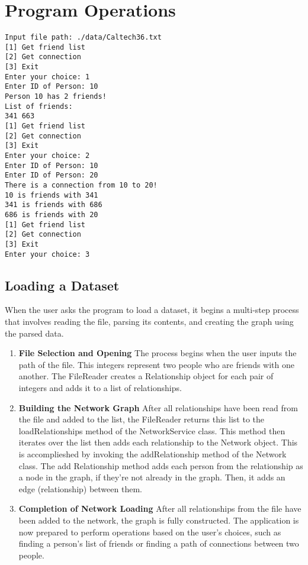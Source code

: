 \section*{\textbf{Program Operations}}

\lstset{basicstyle=\ttfamily}
\begin{lstlisting}[label=verb1,caption={A Sample Run of the Program},frame=tb]
Input file path: ./data/Caltech36.txt
[1] Get friend list
[2] Get connection
[3] Exit
Enter your choice: 1
Enter ID of Person: 10
Person 10 has 2 friends!
List of friends:
341 663
[1] Get friend list
[2] Get connection
[3] Exit
Enter your choice: 2
Enter ID of Person: 10
Enter ID of Person: 20
There is a connection from 10 to 20!
10 is friends with 341
341 is friends with 686
686 is friends with 20
[1] Get friend list
[2] Get connection
[3] Exit
Enter your choice: 3
\end{lstlisting}

\subsection*{\textbf{Loading a Dataset}}
When the user asks the program to load a dataset, it begins a multi-step process that involves reading the file, parsing its contents, and creating the graph using the parsed data.

\begin{enumerate}
	\item \textbf{File Selection and Opening}
	The process begins when the user inputs the path of the file. This integers represent two people who are friends with one another. The FileReader creates a Relationship object for each pair of integers and adds it to a list of relationships.
	
	\item \textbf{Building the Network Graph}
	After all relationships have been read from the file and added to the list, the FileReader returns this list to the loadRelationships method of the NetworkService class. This method then iterates over the list then adds each relationship to the Network object. This is accomplieshed by invoking the addRelationship method of the Network class. The add Relationship method adds each person from the relationship as a node in the graph, if they're not already in the graph. Then, it adds an edge (relationship) between them.
	
	\item \textbf{Completion of Network Loading}
	After all relationships from the file have been added to the network, the graph is fully constructed. The application is now prepared to perform operations based on the user's choices, such as finding a person's list of friends or finding a path of connections between two people.
	
	\end{enumerate}
	

